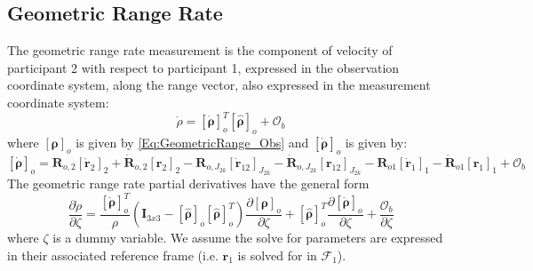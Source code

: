 \subsection{Geometric Range Rate}

The geometric range rate measurement is the component of velocity of
participant 2 with respect to participant 1, expressed in the
observation coordinate system, along the range vector, also
expressed in the measurement coordinate system:
%
\begin{equation}
    \dot{\rho} = \left[ \dot{\boldsymbol{\rho}} \right]_o^T \left[ \hat{\boldsymbol{\rho}}  \right]_{o} + \mathcal{O}_b
\end{equation}
%
where $\left[ \boldsymbol{\rho}  \right]_{o}$ is given by
\ref{Eq:GeometricRange_Obs} and $\left[ \dot{\boldsymbol{\rho}}
\right]_o$ is given by:
\begin{equation}
    \left[ \dot{\boldsymbol{\rho}} \right]_o =  \mathbf{R}_{o,2}\left[ \dot{\mathbf{r}}_2 \right]_{2} + \dot{\mathbf{R}}_{o,2}\left[ \mathbf{r}_2 \right]_{2}
    -\mathbf{R}_{o,J_{2k}}\left[ \dot{\mathbf{r}}_{12}\right]_{J_{2k}} - \dot{\mathbf{R}}_{o,J_{2k}}\left[ \mathbf{r}_{12}\right]_{J_{2k}}
    - \mathbf{R}_{o1}\left[ \dot{\mathbf{r}}_1\right]_1 - \dot{\mathbf{R}}_{o1}\left[ \mathbf{r}_1\right]_1 + \mathcal{O}_b
\end{equation}
%
%
The geometric range rate partial derivatives have the general form
%
\begin{equation}
       \frac{\partial \dot{\rho}}{\partial \zeta} =  \frac{ \left[ \dot{\boldsymbol{\rho}} \right]_o^T }{\rho} \left( \mathbf{I}_{3x3} -
       \left[ \hat{\boldsymbol{\rho}}\right]_o  \left[ \hat{\boldsymbol{\rho}}\right]_o^T \right)\frac{\partial
        \left[ \boldsymbol{\rho}\right]_o }{\partial \zeta} +  \left[ \hat{\boldsymbol{\rho}}\right]_o^T\frac{ \partial\left[ \dot{\boldsymbol{\rho}}\right]_o }{\partial \zeta} +
        \frac{\mathcal{O}_b}{\partial \zeta}
\end{equation}
%
where $\zeta$ is a dummy variable.  We assume the solve for
parameters are expressed in their associated reference frame (i.e.
$\mathbf{r}_1$ is solved for in $\mathcal{F}_1$).
%
